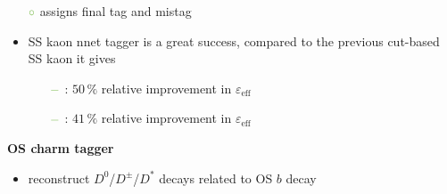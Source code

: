 {\begin{minipage}{0.474\boxwidth}
\begin{itemize}
\begin{itemize}
\begin{itemize}
\item[${\color{tu_gruen}\circ}$] assigns final tag and mistag
\end{itemize}
\end{itemize}
\end{itemize}
\begin{itemize}
\setlength\itemsep{0.01em}
\item SS kaon nnet tagger is a great success, compared \newline to the previous cut-based SS kaon it gives  
\begin{itemize}
\setlength{\itemindent}{-.11in}
\vspace{-0.5em}
\item[${\color{tu_gruen}-}$] \BsToDspi: $50\,\%$ relative improvement in $\varepsilon_{\text{eff}}$
\item[${\color{tu_gruen}-}$] \BsToJPsiPhi: $41\,\%$ relative improvement in $\varepsilon_{\text{eff}}$
\end{itemize}
\end{itemize}
\vspace{-0.1em}
\textbf{OS charm tagger}
\vspace{-0.15em}
\begin{itemize}
\setlength\itemsep{0.01em}
\item reconstruct $D^0$/$D^\pm$/$D^*$ decays related to OS $b$ decay

\end{itemize}
\end{minipage}}
